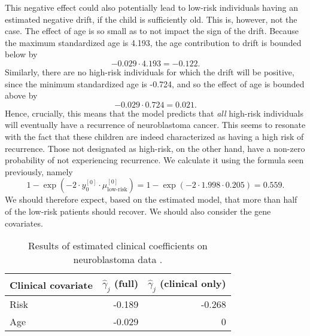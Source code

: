 This negative effect could also potentially lead to low-risk individuals having an estimated negative drift, if the child is sufficiently old.
This is, however, not the case.
The effect of age is so small as to not impact the sign of the drift.
Because the maximum standardized age is 4.193, the age contribution to drift is bounded below by 
\begin{equation*}
    -0.029\cdot4.193=-0.122.
\end{equation*}
Similarly, there are no high-risk individuals for which the drift will be positive, since the minimum standardized age is -0.724, and so the effect of age is bounded above by
\begin{equation*}
    -0.029\cdot0.724=0.021.
\end{equation*}
Hence, crucially, this means that the model predicts that \textit{all} high-risk individuals will eventually have a recurrence of neuroblastoma cancer.
This seems to resonate with the fact that these children are indeed characterized as having a high risk of recurrence.
Those not designated as high-risk, on the other hand, have a non-zero probability of not experiencing recurrence.
We calculate it using the formula seen previously, namely
\begin{equation*}
    1-\exp{(-2\cdot y_{0}^{[0]}\cdot\mu_{\text{low-risk}}^{[0]})}=1-\exp{(-2\cdot 1.998\cdot 0.205)}=0.559.
\end{equation*}
We should therefore expect, based on the estimated model, that more than half of the low-risk patients should recover.
We should also consider the gene covariates.

\begin{table}
\caption{Results of estimated clinical coefficients on neuroblastoma data \citep{oberthuer-data}.}
\label{tab:oberthuer-gamma}
\centering
\begin{tabular}{lrr}
\toprule
Clinical covariate & $\hat{\gamma}_j$ (full) & $\hat{\gamma}_j$ (clinical only)\\
\hline
Risk      &  -0.189  &  -0.268\\
Age       &  -0.029  &       0 \\
\bottomrule
\end{tabular}
\end{table}

